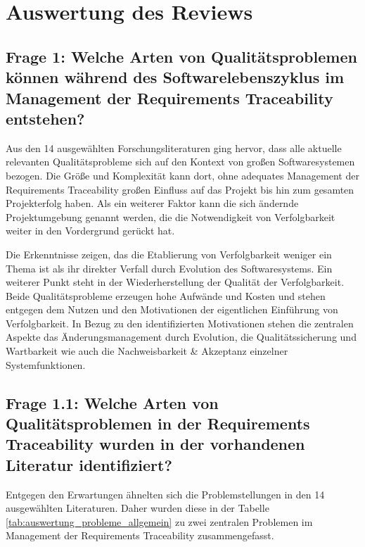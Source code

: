 \section{Auswertung des Reviews}
\label{sec:AuswertungReview}

\subsection{Frage 1: Welche Arten von Qualitätsproblemen können während des Softwarelebenszyklus im Management der Requirements Traceability entstehen?}

Aus den 14 ausgewählten Forschungsliteraturen ging hervor, dass alle aktuelle relevanten Qualitätsprobleme sich auf den Kontext von großen Softwaresystemen bezogen. Die Größe und Komplexität kann dort, ohne adequates Management der Requirements Traceability großen Einfluss auf das Projekt bis hin zum gesamten Projekterfolg haben. Als ein weiterer Faktor kann die sich ändernde Projektumgebung genannt werden, die die Notwendigkeit von Verfolgbarkeit weiter in den Vordergrund gerückt hat.

Die Erkenntnisse zeigen, das die Etablierung von Verfolgbarkeit weniger ein Thema ist als ihr direkter Verfall durch Evolution des Softwaresystems. Ein weiterer Punkt steht in der Wiederherstellung der Qualität der Verfolgbarkeit. Beide Qualitätsprobleme erzeugen hohe Aufwände und Kosten und stehen entgegen dem Nutzen und den Motivationen der eigentlichen Einführung von Verfolgbarkeit. In Bezug zu den identifizierten Motivationen stehen die zentralen Aspekte das Änderungsmanagement durch Evolution, die Qualitätssicherung und Wartbarkeit wie auch die Nachweisbarkeit \& Akzeptanz einzelner Systemfunktionen.

\subsection{Frage 1.1: Welche Arten von Qualitätsproblemen in der Requirements Traceability wurden in der vorhandenen Literatur identifiziert?}

Entgegen den Erwartungen ähnelten sich die Problemstellungen in den 14 ausgewählten Literaturen. Daher wurden diese in der Tabelle \ref{tab:auswertung_probleme_allgemein} zu zwei zentralen Problemen im Management der Requirements Traceability zusammengefasst.

